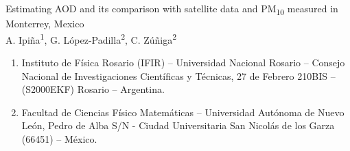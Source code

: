 Estimating AOD and its comparison with satellite data and PM\textsubscript{10} measured in Monterrey, Mexico\\

A. Ipiña\textsuperscript{1}, G. López-Padilla\textsuperscript{2}, C. Zúñiga\textsuperscript{2}\\
\begin{enumerate}
    \changefontsizes{10pt}
    \item Instituto de Física Rosario (IFIR) – Universidad Nacional Rosario – Consejo Nacional de Investigaciones Científicas y Técnicas, 27 de Febrero 210BIS – (S2000EKF) Rosario – Argentina.
    \item Facultad de Ciencias Físico Matemáticas – Universidad Autónoma de Nuevo León, Pedro de Alba S/N - Ciudad Universitaria San Nicolás de los Garza (66451) – México.
\end{enumerate}